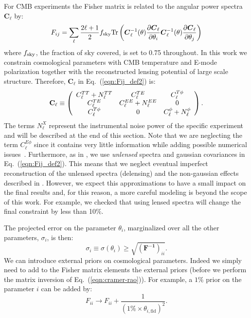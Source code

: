 \documentclass[aps,prd,reprint,superscriptaddress]{revtex4-1}
\newcommand\refeq[1]{Eq.~(\ref{eqn:#1})}
\begin{document}
For CMB experiments the Fisher matrix is related to the angular power spectra $\boldsymbol{C}_\ell$ by:
\begin{equation}
 F_{ij} = \sum_\ell \frac{2\ell+1}{2} f_{\rm sky} {\rm Tr} \left(  \boldsymbol{C}^{-1}_\ell( \theta) \frac{\partial \boldsymbol{C}_\ell}{\partial \theta_i} \boldsymbol{C}^{-1}_\ell( \theta) \frac{\partial \boldsymbol{C}_\ell}{\partial \theta_j}  \right)
 \label{eqn:Fij_def2}
 \end{equation}
 where $f_{\rm sky}$, the fraction of sky covered, is set to 0.75 throughout.
In this work we constrain cosmological parameters with CMB temperature and E-mode polarization together with the reconstructed lensing potential of large scale structure. Therefore, $\boldsymbol{C}_\ell$ in \refeq{Fij_def2} is:
 \begin{eqnarray}
 	\centering
		\mathbf{C}_\ell \equiv \left( \begin{array}{ccc}C_\ell^{TT} + N_\ell^{TT} & C_\ell^{TE} & C_\ell^{T\phi} \\ C_\ell^{TE} & C_\ell^{EE} + N_\ell^{EE} & 0 \\ C_\ell^{T\phi} & 0 & C_\ell^{\phi} + N_\ell^{\phi}\end{array}\right).
	\label{eqn:cov_definition}
\end{eqnarray}
The terms $N_\ell^{X}$ represent the instrumental noise power of the specific experiment and will be described at the end of this section.
Note that we are neglecting the term $C_\ell^{E\phi}$ since it contains very little information while adding possible numerical issues~\cite{wu:2014,2013PhRvD..87h3008H}.
Furthermore, as in \cite{wu:2014}, we use \textit{unlensed} spectra and gaussian covariances in \refeq{Fij_def2}. 
This means that we neglect eventual imperfect reconstruction of the unlensed spectra (delensing) and the non-gaussian effects described in \cite{benoit-levy:2012} .
However, we expect this approximations to have a small impact on the final results and, for this reason, a more careful modeling is beyond the scope of this work. For example, we checked that using lensed spectra will change the final constraint by less than 10$\%$.

The projected error on the parameter $\theta_i$, marginalized over all the other parameters, $\sigma_i$, is then:
\begin{equation}
\sigma_i \equiv \sigma (\theta_i) \geq \sqrt{(\mathbf{ F^{-1}})_{ii}}.
\label{eqn:cramer-rao}
\end{equation}
We can introduce external priors on cosmological parameters.
Indeed we simply need to add to the Fisher matrix elements the external priors (before we perform the matrix inversion of \refeq{cramer-rao}).
For example, a $1\%$ prior on the parameter $i$ can be added by:
\begin{equation}
F_{ii} \rightarrow F_{ii} + \frac{1}{(1\% \times  \theta_{i,\text{fid}})^2}.
\end{equation}
\end{document}
